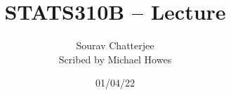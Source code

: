 




\title{STATS310B -- Lecture }
\author{Sourav Chatterjee\\ Scribed by Michael Howes}
\date{01/04/22}

\pagestyle{fancy}
\fancyhf{}


\maketitle
\tableofcontents
